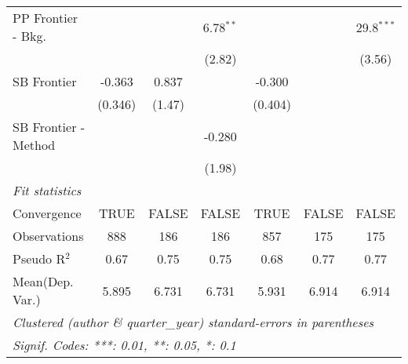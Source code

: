 \begin{tabular}{lcccccc}
   PP Frontier - Bkg.   &               &             & 6.78$^{**}$ &               &                & 29.8$^{***}$\\   
                        &               &             & (2.82)      &               &                & (3.56)\\   
   SB Frontier          & -0.363        & 0.837       &             & -0.300        &                &   \\   
                        & (0.346)       & (1.47)      &             & (0.404)       &                &   \\   
   SB Frontier - Method &               &             & -0.280      &               &                &   \\   
                        &               &             & (1.98)      &               &                &   \\   
   \midrule
   \emph{Fit statistics}\\
   Convergence          &TRUE           & FALSE       & FALSE       & TRUE          & FALSE          & FALSE\\  
   Observations         & 888           & 186         & 186         & 857           & 175            & 175\\  
   Pseudo R$^2$         & 0.67          & 0.75        & 0.75        & 0.68          & 0.77           & 0.77\\  
Mean(Dep. Var.) & 5.895 & 6.731 & 6.731 & 5.931 & 6.914 & 6.914 \\
   \midrule \midrule
   \multicolumn{7}{l}{\emph{Clustered (author \& quarter\_year) standard-errors in parentheses}}\\
   \multicolumn{7}{l}{\emph{Signif. Codes: ***: 0.01, **: 0.05, *: 0.1}}\\
\end{tabular}
\par\endgroup
